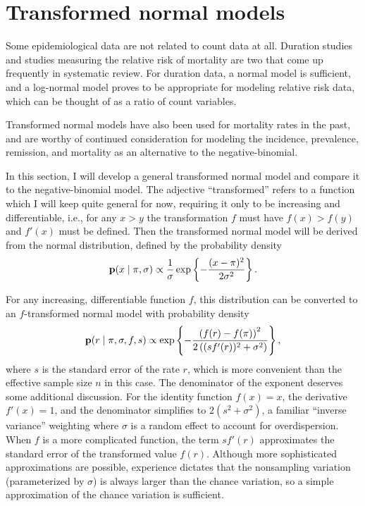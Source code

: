 \section{Transformed normal models}
\label{transformed-normal-models}
Some epidemiological data are not related to count data at all.
Duration studies and studies measuring the relative risk of mortality
are two that come up frequently in systematic review.  For duration
data, a normal model is sufficient, and a log-normal model proves to
be appropriate for modeling relative risk data, which can be thought
of as a ratio of count variables.

Transformed normal models have also been used for mortality rates in
the
past,\cite{girosi_demographic_2008,hogan_maternal_2010,rajaratnam_neonatal_2010}
and are worthy of continued consideration for modeling the incidence,
prevalence, remission, and mortality as an alternative to the
negative-binomial.

In this section, I will develop a general transformed normal model
and compare it to the negative-binomial model.  The adjective
``transformed'' refers to a function which I will keep quite general
for now, requiring it only to be increasing and differentiable,
i.e., for any $x > y$ the transformation $f$ must have $f(x) > f(y)$
and $f'(x)$ must be defined.  Then the transformed normal model will
be derived from the normal distribution, defined by the probability
density
\[
\mathbf{p}(x\;|\; \pi, \sigma)
 \propto \frac{1}{\sigma}
\exp\left\{ -\frac{(x-\pi)^2}{2\sigma^2} \right\}.
\]

For any increasing, differentiable function $f$, this distribution can
be converted to an $f$-transformed normal model with probability
density
\[
\mathbf{p}(r \;|\; \pi, \sigma, f, s) \propto
\exp\left\{-\frac{\left(f(r)-f(\pi)\right)^2}{2\left((sf'(r))^2+\sigma^2\right)}\right\},
\]
where $s$ is the standard error of the rate $r$, which is more
convenient than the effective sample size $n$ in this case. The
denominator of the exponent deserves some additional discussion.  For
the identity function $f(x) = x$, the derivative $f'(x) = 1$, and the
denominator simplifies to $2(s^2 + \sigma^2)$, a familiar ``inverse
variance'' weighting where $\sigma$ is a random effect to account for
overdispersion.  When $f$ is a more complicated function, the term
$sf'(r)$ approximates the standard error of the transformed value
$f(r)$.  Although more sophisticated approximations are possible,
experience dictates that the nonsampling variation (parameterized by
$\sigma$) is always larger than the chance variation, so a simple
approximation of the chance variation is sufficient.

